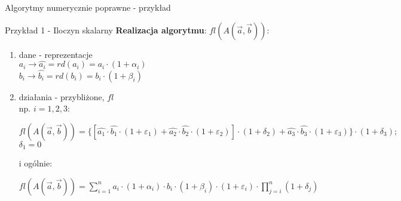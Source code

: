 \begin{frame}{Algorytmy numerycznie poprawne - przykład}
	\begin{exampleblock}{Przykład 1 - Iloczyn skalarny }
		{\bf Realizacja algorytmu}: $fl(A(\vec{a}, \vec{b}))$:
        \begin{enumerate}
        	\item dane - reprezentacje \\
                \hspace{1cm} $a_i \to \hat{a_i} = rd(a_i) = a_i \cdot (1 + \alpha_i)$ \\
                \hspace{1cm} $b_i \to \hat{b_i} = rd(b_i) = b_i \cdot (1 + \beta_i)$
        	\item działania - przybliżone, $fl$ \\
            	np. $i = 1, 2, 3:$ \\ 
                \begin{addmargin}[1em]{0em}
                $
                    fl(A(\vec{a}, \vec{b})) = \{
                        [
                            \hat{a_1} \cdot \hat{b_1} \cdot (1 + \varepsilon_1) +
                            \hat{a_2} \cdot \hat{b_2} \cdot (1 + \varepsilon_2)  
                        ]
                        \cdot (1 + \delta_2) + \hat{a_3} \cdot \hat{b_3} \cdot (1 + \varepsilon_3)
                    \} \cdot (1 + \delta_3); 
                $ \\
                $\delta_1 = 0$ \\
                
                \end{addmargin}
            	i ogólnie:
                \begin{addmargin}[1em]{0em}
                $
                	fl(A(\vec{a}, \vec{b})) =
                	\sum_{i=1}^{n} a_i \cdot (1+\alpha_i) \cdot 
                    b_i \cdot (1 + \beta_i) \cdot (1 + \varepsilon_i)
                    \cdot \prod_{j=i}^{n} (1 + \delta_j)
                $                
                \end{addmargin}
        \end{enumerate}
	\end{exampleblock}
\end{frame}
